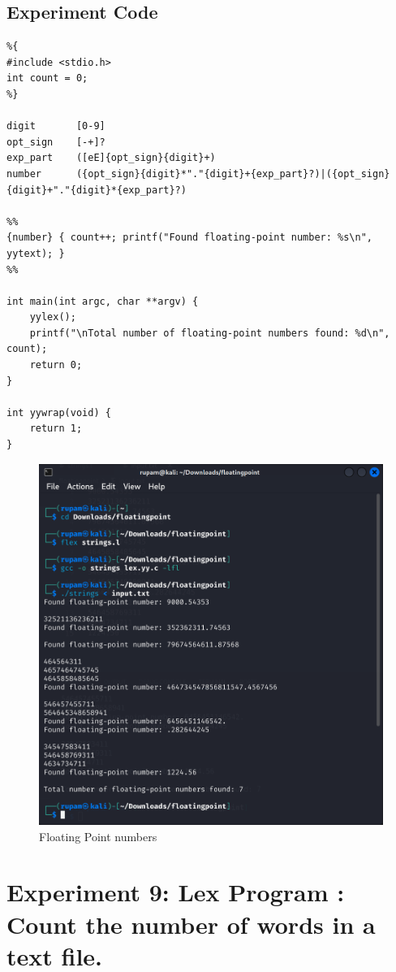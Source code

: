 \documentclass[12pt]{article}
\begin{document}
\subsection*{Experiment Code}
\begin{lstlisting}
%{
#include <stdio.h>
int count = 0;
%}

digit       [0-9]
opt_sign    [-+]?
exp_part    ([eE]{opt_sign}{digit}+)
number      ({opt_sign}{digit}*"."{digit}+{exp_part}?)|({opt_sign}{digit}+"."{digit}*{exp_part}?)

%%
{number} { count++; printf("Found floating-point number: %s\n", yytext); }
%%

int main(int argc, char **argv) {
    yylex();
    printf("\nTotal number of floating-point numbers found: %d\n", count);
    return 0;
}

int yywrap(void) {
    return 1;
}
\end{lstlisting}
\begin{figure}[H]
    \centering
    \includegraphics[width=1\linewidth]{exp8output.png}
    \caption{Floating Point numbers}  
\end{figure}

\newpage
\section*{Experiment 9: Lex Program : Count the number of words in a text file.}
\end{document}
